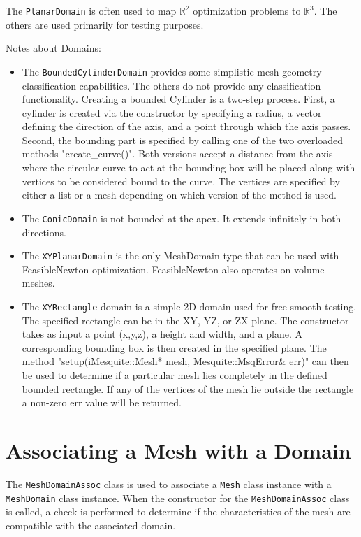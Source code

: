 The \texttt{PlanarDomain} is often used to map $\mathbb{R}^{2}$ optimization
problems to $\mathbb{R}^{3}$.  The others are used primarily for testing
purposes.  

\medskip
\noindent Notes about Domains:
\begin{itemize}
\item The \texttt{BoundedCylinderDomain} provides some simplistic mesh-geometry classification capabilities.  The others do not provide any classification functionality.  Creating a bounded Cylinder is a two-step process. First, a cylinder is created via the constructor by specifying a radius, a vector defining the direction of the axis, and a point through which the axis passes.  Second, the bounding part is specified by calling one of the two overloaded methods "create\_curve()".  Both versions accept a distance from the axis where the circular curve to act at the bounding box will be placed along with vertices to be considered bound to the curve.  The vertices are specified by either a list or a mesh depending on which version of the method is used.
\item The \texttt{ConicDomain} is not bounded at the apex.  It extends infinitely in  both directions.
\item The \texttt{XYPlanarDomain} is the only MeshDomain type that can be used with FeasibleNewton optimization.  FeasibleNewton also operates on volume meshes. 
\item The \texttt{XYRectangle} domain is a simple 2D domain used for free-smooth testing. The specified rectangle can be in the XY, YZ, or ZX plane.   The constructor takes as input a point (x,y,z), a height and width, and a plane.  A corresponding bounding box is then created in the specified plane. The method "setup(iMesquite::Mesh* mesh, Mesquite::MsqError\& err)" can then be used to determine if a particular mesh lies completely in the defined bounded rectangle. If any of the vertices of the mesh lie outside the rectangle a non-zero err value will be returned.
\end{itemize}
   
\section{Associating a Mesh with a Domain} \label{sec:MeshDomainAssoc}
The \texttt{MeshDomainAssoc} class is used to associate a \texttt{Mesh} class instance with a \texttt{MeshDomain} class instance.   When the constructor for the \texttt{MeshDomainAssoc} class is called, a check is performed to determine if the characteristics of the mesh are compatible with the associated domain.  

